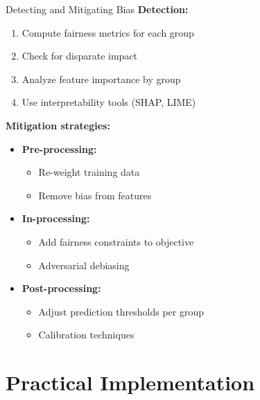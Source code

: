 \documentclass[aspectratio=169]{beamer}
\begin{document}
\begin{frame}{Detecting and Mitigating Bias}
  \textbf{Detection:}
  \begin{enumerate}
    \item Compute fairness metrics for each group
    \item Check for disparate impact
    \item Analyze feature importance by group
    \item Use interpretability tools (SHAP, LIME)
  \end{enumerate}

  \vspace{0.5em}

  \textbf{Mitigation strategies:}

  \begin{itemize}
    \item \textbf{Pre-processing:}
    \begin{itemize}
      \item Re-weight training data
      \item Remove bias from features
    \end{itemize}

    \item \textbf{In-processing:}
    \begin{itemize}
      \item Add fairness constraints to objective
      \item Adversarial debiasing
    \end{itemize}

    \item \textbf{Post-processing:}
    \begin{itemize}
      \item Adjust prediction thresholds per group
      \item Calibration techniques
    \end{itemize}
  \end{itemize}
\end{frame}

\section{Practical Implementation}
\end{document}
